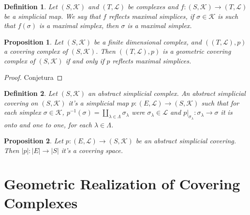 \documentclass{amsart}
\newtheorem{proposition}{Proposition}[section]
\newtheorem{definition}{Definition}[section]
\begin{document}
\begin{definition}
Let  $(S,\mathcal{K})$ and $(T,\mathcal{L})$ be complexes and $f\colon (S,\mathcal{K})\longrightarrow (T,\mathcal{L})$ be a simplicial map. We say that $f$ reflects maximal simplices, if $\sigma\in\mathcal{K}$ is such that $f(\sigma)$ is a maximal simplex, then $\sigma$ is a maximal simplex.
\end{definition}


\begin{proposition}
Let $(S,\mathcal{K})$ be a finite dimensional complex, and $((T,\mathcal{L}),p)$ a covering complex of $(S,\mathcal{K})$. Then $((T,\mathcal{L}),p)$ is a geometric covering complex of $(S,\mathcal{K})$ if and only if $p$ reflects maximal simplices.
\end{proposition}

\begin{proof}
Conjetura
\end{proof}




\begin{definition}
Let $(S,\mathcal{K})$ an abstract simplicial complex. An abstract simplicial covering on $(S,\mathcal{K})$ it's a simplicial map $p\colon(E,\mathcal{L})\to(S,\mathcal{K})$ such that for each simplex $\sigma\in\mathcal{K}$, $p^{-1}(\sigma)=\amalg_{\lambda\in\Lambda}\sigma_{\lambda}$ were $\sigma_{\lambda}\in\mathcal{L}$ and $p|_{\sigma_{\lambda}}\colon \sigma_{\lambda}\to \sigma$ it is onto and one to one, for each $\lambda\in\Lambda$.
\end{definition}

\begin{proposition}
Let $p\colon(E,\mathcal{L})\to(S,\mathcal{K})$ be an abstract simplicial covering. Then $|p|:|E|\to|S|$ it's a covering space.
\end{proposition}

\section{Geometric Realization of Covering Complexes}
\end{document}
